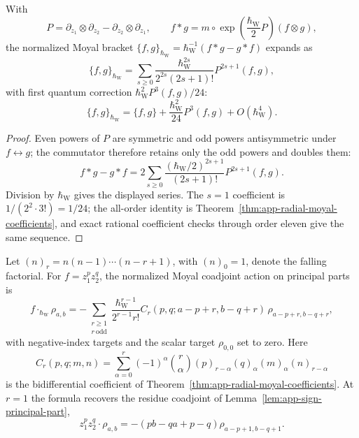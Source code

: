 \begin{lem}
\label{lem:app-sign-moyal-coefficients}
  With
  \[
    P=\partial_{z_1}\otimes\partial_{z_2}
      -\partial_{z_2}\otimes\partial_{z_1},
    \qquad
    f*g=m\circ\exp\!\left(\frac{\hbar_{\mathrm{W}}}{2}P\right)(f\otimes g),
  \]
  the normalized Moyal bracket
  \(\{f,g\}_{\hbar_{\mathrm{W}}}=\hbar_{\mathrm{W}}^{-1}(f*g-g*f)\) expands as
  \[
    \{f,g\}_{\hbar_{\mathrm{W}}}
      =
      \sum_{s\geq0}
      \frac{\hbar_{\mathrm{W}}^{2s}}{2^{2s}(2s+1)!}P^{2s+1}(f,g),
  \]
  with first quantum correction \(\hbar_{\mathrm{W}}^2P^3(f,g)/24\):
  \[
    \{f,g\}_{\hbar_{\mathrm{W}}}=\{f,g\}+\frac{\hbar_{\mathrm{W}}^2}{24}P^3(f,g)+O(\hbar_{\mathrm{W}}^4).
  \]
\end{lem}

\begin{proof}
  Even powers of \(P\) are symmetric and odd powers antisymmetric
  under \(f\leftrightarrow g\); the commutator therefore retains only
  the odd powers and doubles them:
  \[
    f*g-g*f=2\sum_{s\geq0}\frac{(\hbar_{\mathrm{W}}/2)^{2s+1}}{(2s+1)!}P^{2s+1}(f,g).
  \]
  Division by \(\hbar_{\mathrm{W}}\) gives the displayed series.  The \(s=1\)
  coefficient is \(1/(2^2\cdot3!)=1/24\); the all-order identity is
  Theorem~\ref{thm:app-radial-moyal-coefficients}, and exact rational
  coefficient checks through order eleven give the same sequence.
\end{proof}

\begin{lem}
\label{lem:app-sign-moyal-coadjoint}
  Let \((n)_r=n(n-1)\cdots(n-r+1)\), with \((n)_0=1\), denote the
  falling factorial.  For \(f=z_1^pz_2^q\), the normalized Moyal
  coadjoint action on principal parts is
  \[
    f\cdot_{\hbar_{\mathrm{W}}}\rho_{a,b}
      =
      -\sum_{\substack{r\geq1\\ r\ \mathrm{odd}}}
      \frac{\hbar_{\mathrm{W}}^{r-1}}{2^{r-1}r!}
      C_r(p,q;a-p+r,b-q+r)\,
      \rho_{a-p+r,b-q+r},
  \]
  with negative-index targets and the scalar target \(\rho_{0,0}\)
  set to zero.  Here
  \[
    C_r(p,q;m,n)=
      \sum_{\alpha=0}^{r}(-1)^\alpha\binom r\alpha
      (p)_{r-\alpha}(q)_\alpha(m)_\alpha(n)_{r-\alpha}
  \]
  is the bidifferential coefficient of
  Theorem~\ref{thm:app-radial-moyal-coefficients}.  At \(r=1\) the
  formula recovers the residue coadjoint of
  Lemma~\ref{lem:app-sign-principal-part},
  \[
    z_1^pz_2^q\cdot\rho_{a,b}
      =-(pb-qa+p-q)\rho_{a-p+1,b-q+1}.
  \]
\end{lem}

